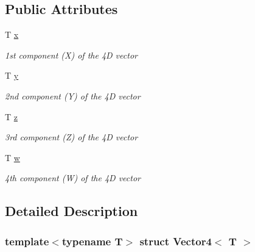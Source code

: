 \subsection*{Public Attributes}
\begin{DoxyCompactItemize}
\item 
\mbox{\label{struct_vector4_a2cedf20d2f695a4f0254681b13311ac9}} 
T \hyperlink{struct_vector4_a2cedf20d2f695a4f0254681b13311ac9}{x}
\begin{DoxyCompactList}\small\item\em 1st component (X) of the 4D vector \end{DoxyCompactList}\item 
\mbox{\label{struct_vector4_aad001ba27515dc2dcb921e9c83596520}} 
T \hyperlink{struct_vector4_aad001ba27515dc2dcb921e9c83596520}{y}
\begin{DoxyCompactList}\small\item\em 2nd component (Y) of the 4D vector \end{DoxyCompactList}\item 
\mbox{\label{struct_vector4_a5a7a1452d661e0b24e4b04c4dbff8ae7}} 
T \hyperlink{struct_vector4_a5a7a1452d661e0b24e4b04c4dbff8ae7}{z}
\begin{DoxyCompactList}\small\item\em 3rd component (Z) of the 4D vector \end{DoxyCompactList}\item 
\mbox{\label{struct_vector4_a83daff43fa2b88b4e76474f4b9a45276}} 
T \hyperlink{struct_vector4_a83daff43fa2b88b4e76474f4b9a45276}{w}
\begin{DoxyCompactList}\small\item\em 4th component (W) of the 4D vector \end{DoxyCompactList}\end{DoxyCompactItemize}


\subsection{Detailed Description}
\subsubsection*{template$<$typename T$>$\newline
struct Vector4$<$ T $>$}

